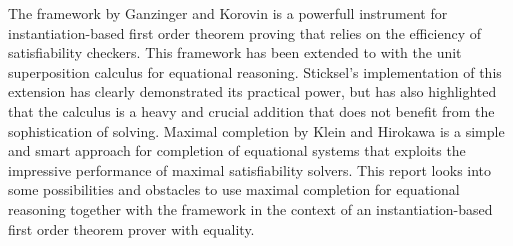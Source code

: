 
The \InstGen framework by Ganzinger and Korovin is a powerfull instrument for instantiation-based
first order theorem proving
that relies on the efficiency of satisfiability checkers.
This framework has been extended to \InstGenEq with the unit superposition calculus for equational reasoning.
Sticksel's implementation of this extension has clearly demonstrated its practical power,
but has also highlighted that the calculus is a heavy and crucial addition that does not benefit
from the sophistication of \SAT solving. 
Maximal completion by Klein and Hirokawa is a simple and smart approach for completion of equational systems
that exploits the impressive performance of maximal satisfiability solvers.
This report looks into some possibilities and obstacles to use maximal completion 
for equational reasoning together with the \InstGen framework
in the context of an instantiation-based first order theorem prover with equality.

